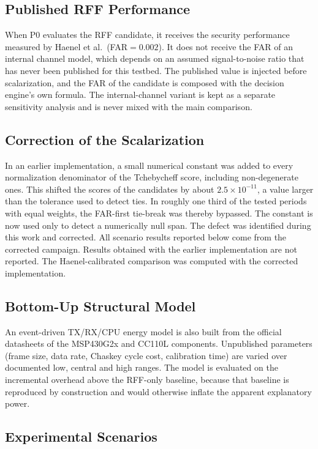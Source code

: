 \documentclass[conference]{IEEEtran}
\begin{document}
\subsection{Published RFF Performance}

When P0 evaluates the RFF candidate, it receives the security performance measured by Haenel et al.\ (FAR$=0.002$). It does not receive the FAR of an internal channel model, which depends on an assumed signal-to-noise ratio that has never been published for this testbed. The published value is injected before scalarization, and the FAR of the candidate is composed with the decision engine's own formula. The internal-channel variant is kept as a separate sensitivity analysis and is never mixed with the main comparison.

\subsection{Correction of the Scalarization}

In an earlier implementation, a small numerical constant was added to every normalization denominator of the Tchebycheff score, including non-degenerate ones. This shifted the scores of the candidates by about $2.5\times10^{-11}$, a value larger than the tolerance used to detect ties. In roughly one third of the tested periods with equal weights, the FAR-first tie-break was thereby bypassed. The constant is now used only to detect a numerically null span. The defect was identified during this work and corrected. All scenario results reported below come from the corrected campaign. Results obtained with the earlier implementation are not reported. The Haenel-calibrated comparison was computed with the corrected implementation.

\subsection{Bottom-Up Structural Model}

An event-driven TX/RX/CPU energy model is also built from the official datasheets of the MSP430G2x and CC110L components. Unpublished parameters (frame size, data rate, Chaskey cycle cost, calibration time) are varied over documented low, central and high ranges. The model is evaluated on the incremental overhead above the RFF-only baseline, because that baseline is reproduced by construction and would otherwise inflate the apparent explanatory power.

\subsection{Experimental Scenarios}
\label{sec:scenarios}
\end{document}
